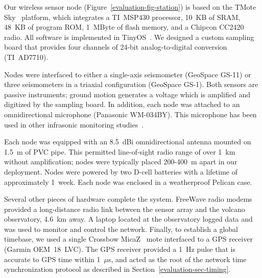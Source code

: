 
Our wireless sensor node (Figure~\ref{evaluation-fig-station}) is based on
the TMote Sky~\cite{moteiv} platform, which integrates a TI~MSP430 processor,
10~KB of SRAM, 48~KB of program ROM, 1~MByte of flash memory, and a Chipcon
CC2420 radio. All software is implemented in TinyOS~\cite{tinyos-asplos00}.
We designed a custom sampling board that provides four channels of 24-bit
analog-to-digital conversion (TI~AD7710). 

Nodes were interfaced to either a single-axis seismometer (GeoSpace GS-11) or
three seismometers in a triaxial configuration (GeoSpace GS-1). 
Both sensors are passive instruments; ground motion generates a voltage which
is amplified and digitized by the sampling board.  In addition, each node was
attached to an omnidirectional microphone (Panasonic WM-034BY). This
microphone has been used in other infrasonic monitoring
studies~\cite{johnson-etal-04b}.

Each node was equipped with an 8.5~dBi omnidirectional antenna mounted on
1.5~m of PVC pipe.  This permitted line-of-sight radio range of over 1~km
without amplification; nodes were typically placed 200-400~m apart in our
deployment. Nodes were powered by two D-cell batteries with a lifetime of
approximately 1~week.  Each node was enclosed in a weatherproof Pelican case.

Several other pieces of hardware complete the system. FreeWave radio modems
provided a long-distance radio link between the sensor array and the volcano
observatory, 4.6~km away. A laptop located at the observatory logged data and
was used to monitor and control the network.  Finally, to establish a global
timebase, we used a single Crossbow MicaZ~\cite{xbow} mote interfaced to a
GPS receiver (Garmin OEM~18~LVC).  The GPS receiver provided a 1~Hz pulse
that is accurate to GPS time within 1~$\mu$s, and acted as the root of the
network time synchronization protocol as described in
Section~\ref{evaluation-sec-timing}.

